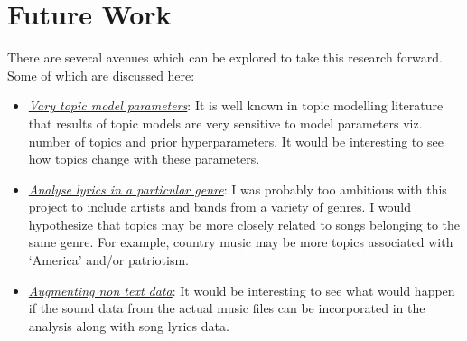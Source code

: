 \documentclass{article}
\begin{document}
  \section{Future Work}
  There are several avenues which can be explored to take this research forward. Some of which are discussed here:
  \begin{itemize}
    \item \underline{\emph{Vary topic model parameters}}: It is well known in topic modelling literature that results of topic models are very sensitive to model parameters viz. number of topics and prior hyperparameters. It would be interesting to see how topics change with these parameters.
    \item \underline{\emph{Analyse lyrics in a particular genre}}: I was probably too ambitious with this project to include artists and bands from a variety of genres. I would hypothesize that topics may be more closely related to songs belonging to the same genre. For example, country music may be more topics associated with `America' and/or patriotism.
    \item \underline{\emph{Augmenting non text data}}: It would be interesting to see what would happen if the sound data from the actual music files can be incorporated in the analysis along with song lyrics data.
  \end{itemize}
\end{document}
